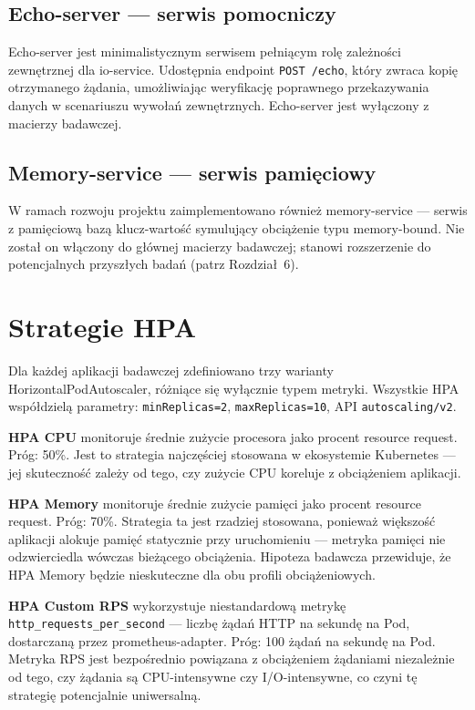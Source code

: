 \subsection{Echo-server --- serwis pomocniczy}

Echo-server jest minimalistycznym serwisem pełniącym rolę zależności zewnętrznej dla io-service. Udostępnia endpoint \texttt{POST /echo}, który zwraca kopię otrzymanego żądania, umożliwiając weryfikację poprawnego przekazywania danych w scenariuszu wywołań zewnętrznych. Echo-server jest wyłączony z macierzy badawczej.

\subsection{Memory-service --- serwis pamięciowy}

W ramach rozwoju projektu zaimplementowano również memory-service --- serwis z pamięciową bazą klucz-wartość symulujący obciążenie typu memory-bound. Nie został on włączony do głównej macierzy badawczej; stanowi rozszerzenie do potencjalnych przyszłych badań (patrz Rozdział~6).

\section{Strategie HPA}

Dla każdej aplikacji badawczej zdefiniowano trzy warianty HorizontalPodAutoscaler, różniące się wyłącznie typem metryki. Wszystkie HPA współdzielą parametry: \texttt{minReplicas=2}, \texttt{maxReplicas=10}, API \texttt{autoscaling/v2}.

\textbf{HPA CPU} monitoruje średnie zużycie procesora jako procent resource request. Próg: 50\%. Jest to strategia najczęściej stosowana w ekosystemie Kubernetes --- jej skuteczność zależy od tego, czy zużycie CPU koreluje z obciążeniem aplikacji.

\textbf{HPA Memory} monitoruje średnie zużycie pamięci jako procent resource request. Próg: 70\%. Strategia ta jest rzadziej stosowana, ponieważ większość aplikacji alokuje pamięć statycznie przy uruchomieniu --- metryka pamięci nie odzwierciedla wówczas bieżącego obciążenia. Hipoteza badawcza przewiduje, że HPA Memory będzie nieskuteczne dla obu profili obciążeniowych.

\textbf{HPA Custom RPS} wykorzystuje niestandardową metrykę \texttt{http\_requests\_per\_second} --- liczbę żądań HTTP na sekundę na Pod, dostarczaną przez prometheus-adapter. Próg: 100 żądań na sekundę na Pod. Metryka RPS jest bezpośrednio powiązana z obciążeniem żądaniami niezależnie od tego, czy żądania są CPU-intensywne czy I/O-intensywne, co czyni tę strategię potencjalnie uniwersalną.

